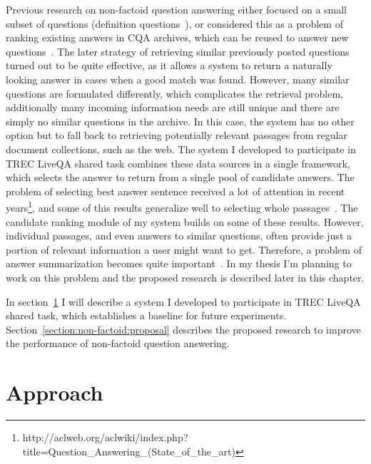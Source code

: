 Previous research on non-factoid question answering either focused on a small subset of questions (\eg definition questions~\cite{hildebrandt2004answering}), or considered this as a problem of ranking existing answers in CQA archives, which can be reused to answer new questions~\cite{carmel2000eresponder,Shtok:2012:LPA:2187836.2187939}.
The later strategy of retrieving similar previously posted questions turned out to be quite effective, as it allows a system to return a naturally looking answer in cases when a good match was found.
However, many similar questions are formulated differently, which complicates the retrieval problem, additionally many incoming information needs are still unique and there are simply no similar questions in the archive.
In this case, the system has no other option but to fall back to retrieving potentially relevant passages from regular document collections, such as the web.
The system I developed to participate in TREC LiveQA shared task combines these data sources in a single framework, which selects the answer to return from a single pool of candidate answers.
The problem of selecting best answer sentence received a lot of attention in recent years\footnote{http://aclweb.org/aclwiki/index.php?title=Question\_Answering\_(State\_of\_the\_art)}, and some of this results generalize well to selecting whole passages~\cite{diwang_lstm_2015}.
The candidate ranking module of my system builds on some of these results.
However, individual passages, and even answers to similar questions, often provide just a portion of relevant information a user might want to get.
Therefore, a problem of answer summarization becomes quite important~\cite{liu2008understanding,pande2013summarizing,tomasoni2010metadata}.
In my thesis I'm planning to work on this problem and the proposed research is described later in this chapter.

In section~\ref{section:non-factoid:approach} I will describe a system I developed to participate in TREC LiveQA shared task, which establishes a baseline for future experiments.
Section~\ref{section:non-factoid:proposal} describes the proposed research to improve the performance of non-factoid question answering.

\section{Approach}
\label{section:non-factoid:approach}



